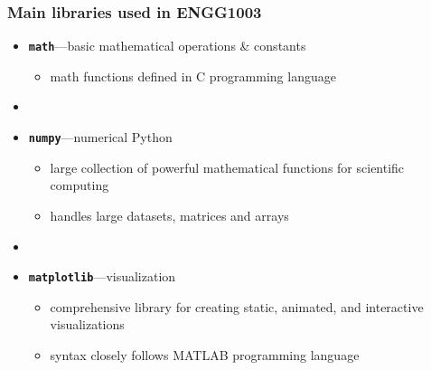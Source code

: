 \documentclass[14pt]{beamer}
\newcommand\red[1]{{\color{red} #1}}
\begin{document}
\begin{frame}[fragile]

\frametitle{Main libraries used in ENGG1003}
\begin{itemize}
	\item \red{\textbf{\texttt{math}}}---basic mathematical operations \& constants
	\begin{itemize}
		\item math functions defined in C programming language
	\end{itemize}
	\item[]
	\item \red{\textbf{\texttt{numpy}}}---numerical Python
	\begin{itemize}
		\item large collection of powerful mathematical functions for scientific computing
		\item handles large datasets, matrices and arrays
	\end{itemize}
	\item[]
	\item \red{\textbf{\texttt{matplotlib}}}---visualization
	\begin{itemize}
		\item comprehensive library for creating static, animated, and interactive visualizations
		\item syntax closely follows MATLAB programming language
	\end{itemize}


\end{itemize}



\end{frame}

%
%
\end{document}
